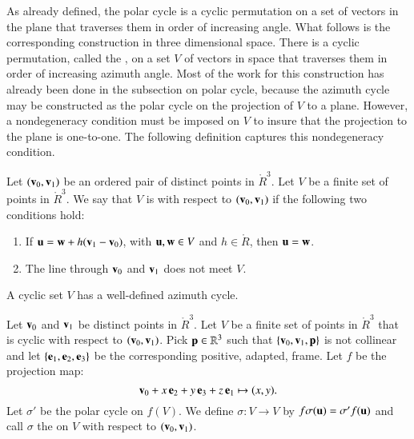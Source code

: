 As already defined, the polar cycle is a cyclic permutation on a set
of vectors in the plane that traverses them in order of increasing
angle.  What follows is the corresponding construction in three
dimensional space.  There is a cyclic permutation, called the
, on a set $V$ of vectors in space that
traverses them in order of increasing azimuth angle.  Most of the work
for this construction has already been done in the subsection on polar
cycle, because the azimuth cycle may be constructed as the polar cycle
on the projection of $V$ to a plane.  However, a nondegeneracy
condition must be imposed on $V$ to insure that the projection to the
plane is one-to-one.  The following definition captures this
nondegeneracy condition.  %
%
%
%


\begin{definition}
Let $({\mathbf v}_0,{\mathbf v}_1)$ be an ordered pair of
  distinct points in $\ring{R}^3$.  Let $V$ be a finite set of points
  in $\ring{R}^3$.  We say that $V$ is  with respect to
  $({\mathbf v}_0,{\mathbf v}_1)$ if the following two conditions hold:
\begin{enumerate}
\item If ${\mathbf u} = {\mathbf w} + h ({\mathbf v}_1-{\mathbf v}_0)$, with ${\mathbf u},{\mathbf w}\in V$ and $h\in \ring{R}$,
then ${\mathbf u}={\mathbf w}$.  
\item  The line through ${\mathbf v}_0$ and ${\mathbf v}_1$ does not meet $V$.
\end{enumerate}
\end{definition}
%

A cyclic set $V$ has a well-defined azimuth cycle.

\begin{definition}
  Let ${\mathbf v}_0$ and ${\mathbf v}_1$ be distinct points in $\ring{R}^3$.  Let $V$
  be a finite set of points in $\ring{R}^3$ that is cyclic with
  respect to $({\mathbf v}_0,{\mathbf v}_1)$.  Pick ${\mathbf p}\in\mathbb{R}^3$ such that
  $\{{\mathbf v}_0,{\mathbf v}_1,{\mathbf p}\}$ is not collinear and let $\{{\mathbf e}_1,{\mathbf e}_2,{\mathbf e}_3\}$ be
  the corresponding positive, adapted, frame.  Let $f$ be the
  projection map:
\[ {\mathbf v}_0 + x\, {\mathbf e}_2 + y\, {\mathbf e}_3 + z\, {\mathbf e}_1 \mapsto
(x,y).\] 
Let $\sigma'$ be the polar cycle on $f(V)$. We define
$\sigma:V\to V$ by $f\sigma({\mathbf u}) =\sigma'f({\mathbf u})$
and call $\sigma$ the 
on $V$ with respect to $({\mathbf v}_0,{\mathbf v}_1)$.
%
%
%
%
%
\end{definition}

